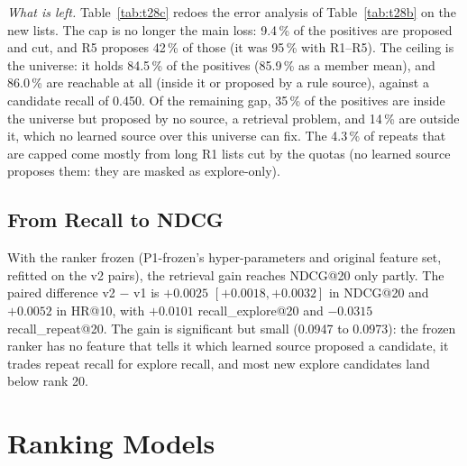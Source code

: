 \documentclass{ieeeaccess}
\begin{document}
\textit{What is left.} Table~\ref{tab:t28c} redoes the error analysis of Table~\ref{tab:t28b} on the new lists. The cap is no longer
the main loss: 9.4\,\% of the positives are proposed and cut, and R5 proposes 42\,\% of those (it was 95\,\% with R1--R5). The
ceiling is the universe: it holds 84.5\,\% of the positives (85.9\,\% as a member mean), and 86.0\,\% are reachable at all (inside
it or proposed by a rule source), against a candidate recall of 0.450. Of the remaining gap, 35\,\% of the positives are inside the
universe but proposed by no source, a retrieval problem, and 14\,\% are outside it, which no learned source over this universe can
fix. The 4.3\,\% of repeats that are capped come mostly from long R1 lists cut by the quotas (no learned source proposes
them: they are masked as explore-only).

\subsection{From Recall to NDCG}
With the ranker frozen (P1-frozen's hyper-parameters and original feature set, refitted on the v2 pairs), the retrieval gain reaches
NDCG@20 only partly. The paired difference v2 $-$ v1 is $+0.0025$ $[+0.0018, +0.0032]$ in NDCG@20 and $+0.0052$ in HR@10, with
$+0.0101$ recall\_explore@20 and $-0.0315$ recall\_repeat@20. The gain is significant but small (0.0947 to 0.0973): the frozen ranker
has no feature that tells it which learned source proposed a candidate, it trades repeat recall for explore recall, and most new
explore candidates land below rank 20.

\section{Ranking Models}
\label{sec:ranking}
\end{document}
